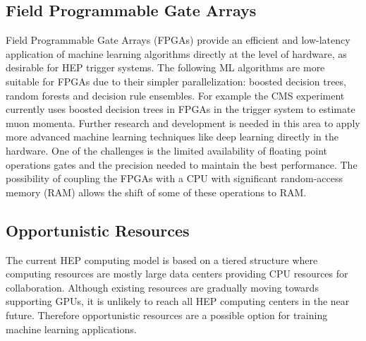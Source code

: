 \subsection{Field Programmable Gate Arrays}
Field Programmable Gate Arrays (FPGAs) provide an efficient and low-latency application of machine learning algorithms directly at the level of hardware, as desirable for HEP trigger systems. The following ML algorithms are more suitable for FPGAs due to their simpler parallelization: boosted decision trees, random forests and decision rule ensembles. For example the CMS experiment currently uses boosted decision trees in FPGAs in the trigger system to estimate muon momenta. Further research and development is needed in this area to apply more advanced machine learning techniques like deep learning directly in the hardware. One of the challenges is the limited availability of floating point operations gates and the precision needed to maintain the best performance. The possibility of coupling the FPGAs with a CPU with significant random-access memory (RAM) allows the shift of some of these operations to RAM.


\subsection{Opportunistic Resources}
The current HEP computing model is based on a tiered structure where computing resources are mostly large data centers providing CPU resources for collaboration. Although existing resources are gradually moving towards supporting GPUs, it is unlikely to reach all HEP computing centers in the near future. Therefore opportunistic resources are a possible option for training machine learning applications.


